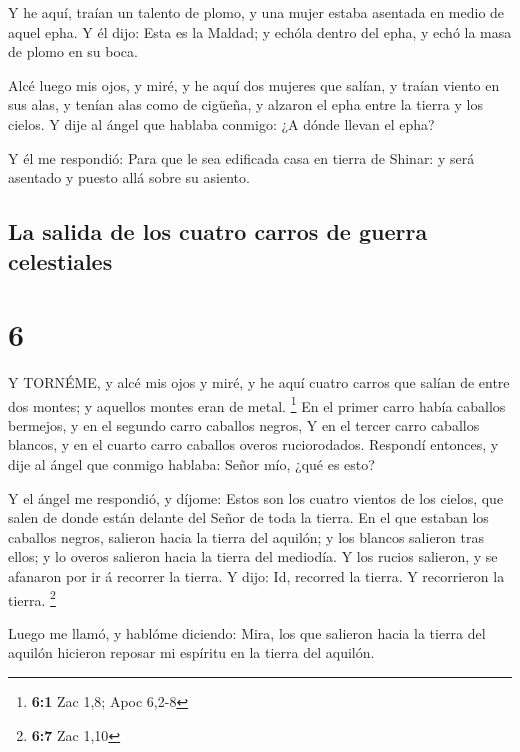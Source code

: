  Y he aquí, traían un talento de plomo, y una mujer estaba
asentada en medio de aquel epha.  Y él dijo: Esta es la
Maldad; y echóla dentro del epha, y echó la masa de plomo en su boca.

 Alcé luego mis ojos, y miré, y he aquí dos mujeres que
salían, y traían viento en sus alas, y tenían alas como de cigüeña, y
alzaron el epha entre la tierra y los cielos.  Y dije al
ángel que hablaba conmigo: ¿A dónde llevan el epha?

 Y él me respondió: Para que le sea edificada casa en
tierra de Shinar: y será asentado y puesto allá sobre su asiento.

\hypertarget{la-salida-de-los-cuatro-carros-de-guerra-celestiales}{%
\subsection{La salida de los cuatro carros de guerra
celestiales}\label{la-salida-de-los-cuatro-carros-de-guerra-celestiales}}

\hypertarget{section-5}{%
\section{6}\label{section-5}}

 Y TORNÉME, y alcé mis ojos y miré, y he aquí cuatro carros
que salían de entre dos montes; y aquellos montes eran de metal.
\footnote{\textbf{6:1} Zac 1,8; Apoc 6,2-8}  En el primer
carro había caballos bermejos, y en el segundo carro caballos negros,
 Y en el tercer carro caballos blancos, y en el cuarto carro
caballos overos ruciorodados.  Respondí entonces, y dije al
ángel que conmigo hablaba: Señor mío, ¿qué es esto?

 Y el ángel me respondió, y díjome: Estos son los cuatro
vientos de los cielos, que salen de donde están delante del Señor de
toda la tierra.  En el que estaban los caballos negros,
salieron hacia la tierra del aquilón; y los blancos salieron tras ellos;
y lo overos salieron hacia la tierra del mediodía.  Y los
rucios salieron, y se afanaron por ir á recorrer la tierra. Y dijo: Id,
recorred la tierra. Y recorrieron la tierra. \footnote{\textbf{6:7} Zac
  1,10}

 Luego me llamó, y hablóme diciendo: Mira, los que salieron
hacia la tierra del aquilón hicieron reposar mi espíritu en la tierra
del aquilón.

